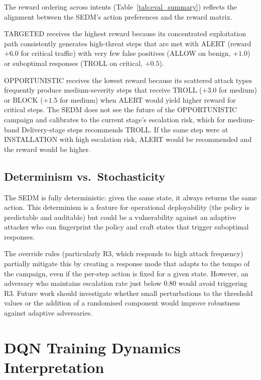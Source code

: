 The reward ordering across intents (Table~\ref{tab:eval_summary}) reflects
the alignment between the SEDM's action preferences and the reward matrix.

TARGETED receives the highest reward because its concentrated exploitation
path consistently generates high-threat steps that are met with ALERT
(reward $+6.0$ for critical traffic) with very few false positives (ALLOW
on benign, $+1.0$) or suboptimal responses (TROLL on critical, $+0.5$).

OPPORTUNISTIC receives the lowest reward because its scattered attack types
frequently produce medium-severity steps that receive TROLL ($+3.0$ for
medium) or BLOCK ($+1.5$ for medium) when ALERT would yield higher reward
for critical steps.
The SEDM does not see the future of the OPPORTUNISTIC campaign and
calibrates to the current stage's escalation risk, which for medium-band
Delivery-stage steps recommends TROLL.
If the same step were at INSTALLATION with high escalation risk, ALERT
would be recommended and the reward would be higher.

\subsection{Determinism vs.\ Stochasticity}

The SEDM is fully deterministic: given the same state, it always returns
the same action.
This determinism is a feature for operational deployability (the policy is
predictable and auditable) but could be a vulnerability against an adaptive
attacker who can fingerprint the policy and craft states that trigger
suboptimal responses.

The override rules (particularly R3, which responds to high attack frequency)
partially mitigate this by creating a response mode that adapts to the tempo
of the campaign, even if the per-step action is fixed for a given state.
However, an adversary who maintains escalation rate just below 0.80 would
avoid triggering R3.
Future work should investigate whether small perturbations to the threshold
values or the addition of a randomised component would improve robustness
against adaptive adversaries.

\section{DQN Training Dynamics Interpretation}
\label{sec:disc_dqn}

